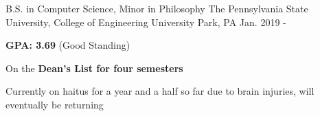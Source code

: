 

\begin{cventries}

  \cventry
    {B.S. in Computer Science, Minor in Philosophy} %
    {The Pennsylvania State University, College of Engineering} %
    {University Park, PA} %
    {Jan. 2019 - } %
    {
      \begin{cvitems} %
        \item {\textbf{GPA: 3.69} (Good Standing)}
        \item {On the \textbf{Dean's List for four semesters}}
        \item {Currently on haitus for a year and a half so far due to brain injuries, will eventually be returning}
      \end{cvitems}
    }

\end{cventries}
